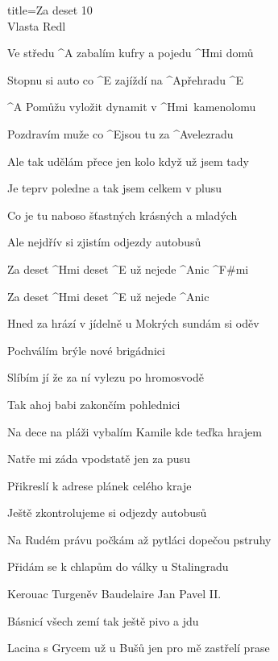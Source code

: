 \begin{song}{title=\predtitle\centering Za deset 10 \\\large Vlasta Redl  \vspace*{-0.3cm}}  %
\begin{centerjustified}
\normalni

\begin{varwidth}[t]{0.50\textwidth}\setlength{\parindent}{0.0cm}  %

\sloka
	Ve středu ^{A \z}zabalím kufry a pojedu ^{Hmi \z}domů
	
	Stopnu si auto co ^{E \z}zajíždí na ^{\z A}přehradu ^{E}

	^{A \z}Pomůžu vyložit dynamit v ^{\z Hmi \,}kamenolomu

	Pozdravím muže co ^{E}jsou tu za ^{\z A}velezradu

	\mezera

	Ale tak udělám přece jen kolo když už jsem tady
	
	Je teprv poledne a tak jsem celkem v plusu

	Co je tu naboso šťastných krásných a mladých

	Ale nejdřív si zjistím odjezdy autobusů

	Za deset ^{Hmi \z}deset ^{E} už nejede ^{A}nic ^{F\#mi}

	Za deset ^{Hmi \z}deset ^{E} už nejede ^{A}nic

\sloka
	Hned za hrází v jídelně u Mokrých sundám si oděv

	Pochválím brýle nové brigádnici

	Slíbím jí že za ní vylezu po hromosvodě
	
	Tak ahoj babi zakončím pohlednici
	
	Na dece na pláži vybalím Kamile kde teďka hrajem
	
	Natře mi záda vpodstatě jen za pusu
	
	Přikreslí k adrese plánek celého kraje
	
	Ještě zkontrolujeme si odjezdy autobusů


\sloka
	Na Rudém právu počkám až pytláci dopečou pstruhy

	Přidám se k chlapům do války u Stalingradu

	Kerouac Turgeněv Baudelaire Jan Pavel II.
	
	Básnicí všech zemí tak ještě pivo a jdu
	
	Lacina s Grycem už u Bušů jen pro mě zastřelí prase


\end{varwidth}
\end{centerjustified}
\end{song}
